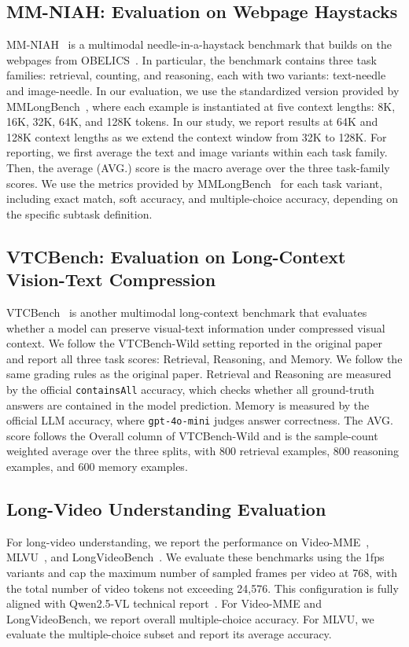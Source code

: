 \documentclass{llmxive}
\begin{document}
{{{\subsection{MM-NIAH: Evaluation on Webpage Haystacks}
\label{app:evaluation_details:mm_niah}
MM-NIAH~\citep{wang2024needle} is a multimodal needle-in-a-haystack benchmark that builds on the webpages from OBELICS~\citep{laurenccon2023obelics}.
In particular, the benchmark contains three task families: retrieval, counting, and reasoning, each with two variants: text-needle and image-needle.
In our evaluation, we use the standardized version provided by MMLongBench~\citep{wang2025mmlongbench}, where each example is instantiated at five context lengths: 8K, 16K, 32K, 64K, and 128K tokens.
In our study, we report results at 64K and 128K context lengths as we extend the context window from 32K to 128K.
For reporting, we first average the text and image variants within each task family.
Then, the average (AVG.) score is the macro average over the three task-family scores.
We use the metrics provided by MMLongBench~\citep{wang2025mmlongbench} for each task variant, including exact match, soft accuracy, and multiple-choice accuracy, depending on the specific subtask definition.

\subsection{VTCBench: Evaluation on Long-Context Vision-Text Compression}
\label{app:evaluation_details:vtcbench}
VTCBench~\citep{zhao2025vtcbench} is another multimodal long-context benchmark that evaluates whether a model can preserve visual-text information under compressed visual context.
We follow the VTCBench-Wild setting reported in the original paper and report all three task scores: Retrieval, Reasoning, and Memory.
We follow the same grading rules as the original paper.
Retrieval and Reasoning are measured by the official \texttt{containsAll} accuracy, which checks whether all ground-truth answers are contained in the model prediction.
Memory is measured by the official LLM accuracy, where \texttt{gpt-4o-mini} judges answer correctness.
The AVG. score follows the Overall column of VTCBench-Wild and is the sample-count weighted average over the three splits, with 800 retrieval examples, 800 reasoning examples, and 600 memory examples.

\subsection{Long-Video Understanding Evaluation}
\label{app:evaluation_details:video}
For long-video understanding, we report the performance on Video-MME~\citep{fu2025video}, MLVU~\citep{zhou2025mlvu}, and LongVideoBench~\citep{wu2024longvideobench}.
We evaluate these benchmarks using the 1fps variants and cap the maximum number of sampled frames per video at 768, with the total number of video tokens not exceeding 24,576.
This configuration is fully aligned with Qwen2.5-VL technical report~\citep{bai2025qwen2}.
For Video-MME and LongVideoBench, we report overall multiple-choice accuracy.
For MLVU, we evaluate the multiple-choice subset and report its average accuracy.

}}}
\end{document}
